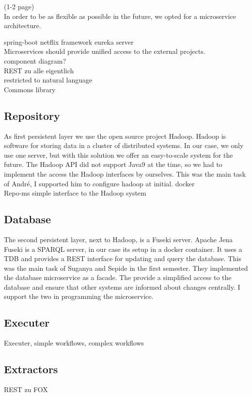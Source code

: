 (1-2 page)\\
In order to be as flexible as possible in the future, we opted for a microservice architecture. 

spring-boot netflix framework eureka server\\
Microservices should provide unified access to the external projects.\\
component diagram?\\
REST zu alle eigentlich\\
restricted to natural language\\
Commons library\\

\subsection{Repository}
As first persistent layer we use the open source project Hadoop. Hadoop is software for storing data in a cluster of distributed systems. In our case, we only use one server, but with this solution we offer an easy-to-scale system for the future. The Hadoop API did not support Java9 at the time, so we had to implement the access the Hadoop interfaces by ourselves. This was the main task of André, I supported him to configure hadoop at initial.
docker \\
Repo-ms simple interface to the Hadoop system\\

\subsection{Database}
The second persistent layer, next to Hadoop, is a Fuseki server. Apache Jena Fuseki is a SPARQL server, in our case its setup in a docker container. It uses a TDB and provides a REST interface for updating and query the database. This was the main task of Suganya and Sepide in the first semester. They implemented the database microservice as a facade. The provide a simplified access to the database and ensure that other systems are informed about changes centrally. I support the two in programming the microservice.

\subsection{Executer}
Executer, simple workflows, complex workflows\\

\subsection{Extractors}
REST zu FOX\\

